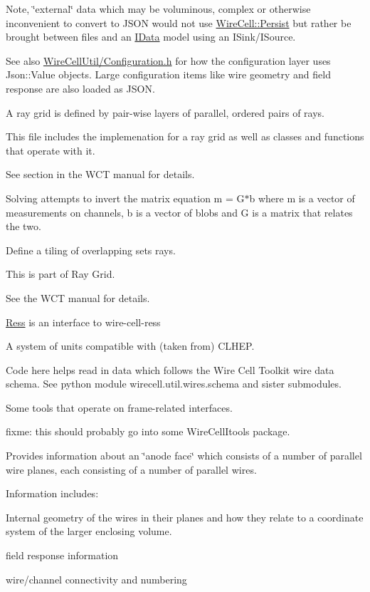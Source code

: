Note, \char`\"{}external\char`\"{} data which may be voluminous, complex or otherwise inconvenient to convert to J\+S\+ON would not use \hyperlink{namespace_wire_cell_1_1_persist}{Wire\+Cell\+::\+Persist} but rather be brought between files and an \hyperlink{class_wire_cell_1_1_i_data}{I\+Data} model using an I\+Sink/\+I\+Source.

See also \hyperlink{_configuration_8h}{Wire\+Cell\+Util/\+Configuration.\+h} for how the configuration layer uses Json\+::\+Value objects. Large configuration items like wire geometry and field response are also loaded as J\+S\+ON.

A ray grid is defined by pair-\/wise layers of parallel, ordered pairs of rays.

This file includes the implemenation for a ray grid as well as classes and functions that operate with it.

See section in the W\+CT manual for details.

Solving attempts to invert the matrix equation m = G$\ast$b where m is a vector of measurements on channels, b is a vector of blobs and G is a matrix that relates the two.

Define a tiling of overlapping sets rays.

This is part of Ray Grid.

See the W\+CT manual for details.

\hyperlink{namespace_wire_cell_1_1_ress}{Ress} is an interface to wire-\/cell-\/ress

A system of units compatible with (taken from) C\+L\+H\+EP.

Code here helps read in data which follows the Wire Cell Toolkit wire data schema. See python module wirecell.\+util.\+wires.\+schema and sister submodules.

Some tools that operate on frame-\/related interfaces.

fixme\+: this should probably go into some Wire\+Cell\+Itools package.

Provides information about an \char`\"{}anode face\char`\"{} which consists of a number of parallel wire planes, each consisting of a number of parallel wires.

Information includes\+:


\begin{DoxyItemize}
\item Internal geometry of the wires in their planes and how they relate to a coordinate system of the larger enclosing volume.
\item field response information
\item wire/channel connectivity and numbering
\end{DoxyItemize}

